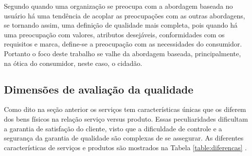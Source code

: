 Segundo \cite{paladini1995} quando uma organização se preocupa com a abordagem baseada no usuário há uma tendência de acoplar as preocupações com as outras abordagens, se tornando assim, uma definição de qualidade mais completa, pois quando há uma preocupação com valores, atributos desejáveis, conformidades com os requisitos e marca, define-se a preocupação com as necessidades do consumidor. Portanto o foco deste trabalho se valhe da abordagem baseada, principalmente, na ótica do consumidor, neste caso, o cidadão.

\subsection{Dimensões de avaliação da qualidade}

Como dito na seção anterior os serviços tem características únicas que os diferem dos bens físicos na relação serviço versus produto. Essas peculiaridades dificultam a garantia de satisfação do cliente, visto que a dificuldade de controle e a segurança da garantia de qualidade são complexas de se assegurar. As diferentes características de serviços e produtos são mostrados na Tabela \ref{table:diferencas} \cite{gronroos1993}.

